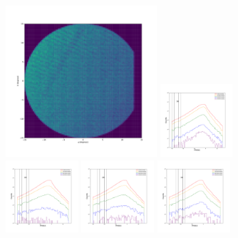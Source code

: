 \documentclass[12pt,prd]{article}
\begin{document}
\begin{figure}[h!]
\centering
\includegraphics[width=0.5\textwidth]{../figures/histogram2dgaiascan_l315_0_b66_4_ra197_7_dec4_0_npy.pdf}
\includegraphics[width=0.24\textwidth]{../figures/scanning_plotsgaiascan_l315_0_b66_4_ra197_7_dec4_0_npy_0.pdf}
\includegraphics[width=0.24\textwidth]{../figures/scanning_plotsgaiascan_l315_0_b66_4_ra197_7_dec4_0_npy_1.pdf}
\includegraphics[width=0.24\textwidth]{../figures/scanning_plotsgaiascan_l315_0_b66_4_ra197_7_dec4_0_npy_2.pdf}
\includegraphics[width=0.24\textwidth]{../figures/scanning_plotsgaiascan_l315_0_b66_4_ra197_7_dec4_0_npy_3.pdf}

\end{figure}
\end{document}
